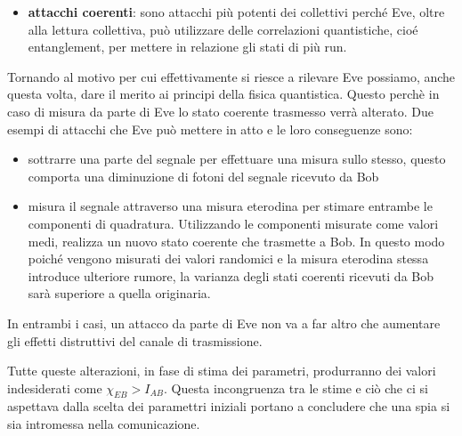 \begin{itemize}
\begin{figure}[H]
\begin{center}
\end{center}
\caption[Schema attacco collettivo]{Schema che descrive un attatto collettivo mostrando che Eve effettua operazione su pi\`u segnali contemporaneamente.} \label{fig:attacco-collettivo}
\end{figure}
\item \textbf{attacchi coerenti}: sono attacchi pi\`u potenti dei collettivi perché Eve, oltre alla lettura collettiva, può utilizzare delle correlazioni quantistiche, cioé entanglement, per mettere in relazione gli stati di pi\`u run.
\end{itemize} 

Tornando al motivo per cui effettivamente si riesce a rilevare Eve possiamo, anche questa volta, dare il merito ai principi della fisica quantistica. Questo perch\`e in caso di misura da parte di Eve lo stato coerente trasmesso verr\`a alterato. Due esempi di attacchi che Eve pu\`o mettere in atto e le loro conseguenze sono: 
\begin{itemize}
\item sottrarre una parte del segnale per effettuare una misura sullo stesso, questo comporta una diminuzione di fotoni del segnale ricevuto da Bob
\item misura il segnale attraverso una misura eterodina per stimare entrambe le componenti di quadratura. Utilizzando le componenti misurate come valori medi, realizza un nuovo stato coerente che trasmette a Bob. In questo modo poich\'e vengono misurati dei valori randomici e la misura eterodina stessa introduce ulteriore rumore, la varianza degli stati coerenti ricevuti da Bob sar\`a superiore a quella originaria. 
\end{itemize} 
In entrambi i casi, un attacco da parte di Eve non va a far altro che aumentare gli effetti distruttivi del canale di trasmissione.


Tutte queste alterazioni, in fase di stima dei parametri, produrranno dei valori indesiderati come $\chi_{EB} > I_{AB}$. Questa incongruenza tra le stime e ci\`o che ci si aspettava dalla scelta dei paramettri iniziali portano a concludere che una spia si sia intromessa nella comunicazione. 


